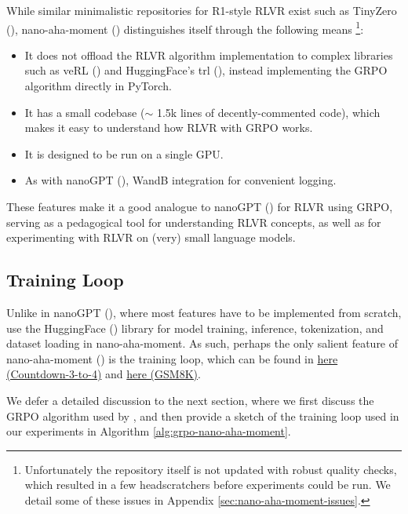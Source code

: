\documentclass{article} %
\theoremstyle{definition}
\begin{document}
While similar minimalistic repositories for R1-style RLVR exist such as TinyZero (\cite{tinyzero}),
nano-aha-moment (\cite{nano-aha-moment}) distinguishes itself through the following means \footnote{
    Unfortunately the repository itself is not updated with robust quality checks,
    which resulted in a few headscratchers before experiments could be run.
    We detail some of these issues in Appendix \ref{sec:nano-aha-moment-issues}.
}:
\begin{itemize}
    \item It does not offload the RLVR algorithm implementation to complex libraries such as veRL (\cite{veRL, veRL2})
and HuggingFace's trl (\cite{trl}), instead implementing the GRPO algorithm directly in PyTorch. 
    \item It has a small codebase ($\sim$ 1.5k lines of decently-commented code), which 
        makes it easy to understand how RLVR with GRPO works.
    \item It is designed to be run on a single GPU.
    \item As with nanoGPT (\cite{nanoGPT}), WandB \cite{wandb} integration for convenient logging.
\end{itemize} 

These features make it a good analogue to nanoGPT (\cite{nanoGPT}) for RLVR using GRPO,
serving as a pedagogical tool for understanding RLVR concepts, 
as well as for experimenting with RLVR on (very) small language models.

\subsection{Training Loop}

Unlike in nanoGPT (\cite{nanoGPT}), where most features have to be implemented from scratch,
\cite{nano-aha-moment} use the HuggingFace (\cite{HuggingFace}) library
for model training, inference, tokenization, and dataset loading in nano-aha-moment.
As such, perhaps the only salient feature of nano-aha-moment (\cite{nano-aha-moment})
is the training loop, which can be found in \href{../../code/nano-aha-moment/nano_r1_script.py}{here (Countdown-3-to-4)} and 
\href{../../code/nano-aha-moment/nano_r1_gsm8k.py}{here (GSM8K)}.

We defer a detailed discussion to the next section, where we first discuss the GRPO algorithm
used by \cite{nano-aha-moment}, and then provide a sketch of the training loop
used in our experiments in Algorithm \ref{alg:grpo-nano-aha-moment}.
\end{document}
